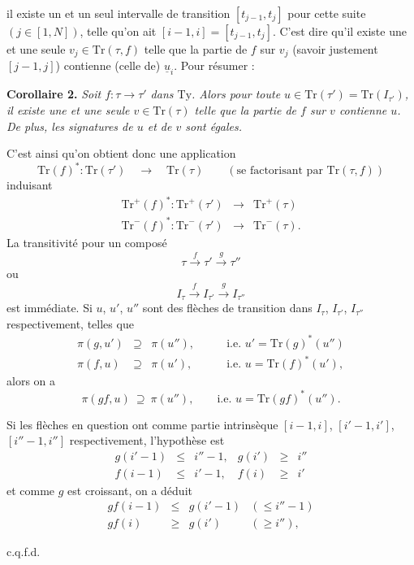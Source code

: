\documentclass[11pt]{article}
\newcommand{\printedpage}[1]{\marginpar{\footnotesize p.~#1}}
\newcommand{\msp}[1]{\marginpar{\footnotesize [#1]}}
\newcommand{\Ty}{\mathrm{Ty}}
\newcommand{\Tr}{\mathrm{Tr}}
\begin{document}
\printedpage{27}
\msp{page 42}
il existe un et un seul intervalle de transition $[t_{j-1}, t_j]$ pour cette suite $(j \in [1, N])$, telle qu'on ait $[i-1, i] = [t_{j-1}, t_j]$. C'est dire qu'il existe une et une seule $v_j \in \Tr(\tau, f)$ telle que la partie de $f$ sur $v_j$ (savoir justement $[j-1, j]$) contienne (celle de) $\underline{u}_i$. Pour résumer :

\textbf{Corollaire 2.} \textit{Soit $f : \tau \longrightarrow \tau'$ dans $\Ty$. Alors pour toute $u \in \Tr(\tau') = \Tr(I_{\tau'})$, il existe une et une seule $v \in \Tr(\tau)$ telle que la partie de $f$ sur $v$ contienne $u$. De plus, les signatures de $u$ et de $v$ sont égales.}

C'est ainsi qu'on obtient donc une application
\[
\Tr(f)^* : \Tr(\tau') \quad \longrightarrow \quad \Tr(\tau) \qquad (\text{se factorisant par } \Tr(\tau, f))
\]
induisant
\[
\begin{array}{rcl}
\Tr^+(f)^* : \Tr^+(\tau') & \longrightarrow & \Tr^+(\tau) \\
\Tr^-(f)^* : \Tr^-(\tau') & \longrightarrow & \Tr^-(\tau).
\end{array}
\]
La transitivité pour un composé
\[
\tau \xrightarrow{f} \tau' \xrightarrow{g} \tau''
\]
ou
\[
I_\tau \xrightarrow{f} I_{\tau'} \xrightarrow{g} I_{\tau''}
\]
est immédiate. Si $u$, $u'$, $u''$ sont des flèches de transition dans $I_\tau$, $I_{\tau'}$, $I_{\tau''}$ respectivement, telles que
\[
\begin{array}{rcll}
\pi(g, u') & \supseteq & \pi(u''), & \qquad \text{i.e. } u' = \Tr(g)^*(u'') \\
\pi(f, u) & \supseteq & \pi(u'), & \qquad \text{i.e. } u = \Tr(f)^*(u'),
\end{array}
\]
alors on a
\[
\pi(gf, u) \ \supseteq\ \pi(u''), \qquad \text{i.e. } u = \Tr(gf)^*(u'').
\]

\msp{page 43}
Si les flèches en question ont comme partie intrinsèque $[i-1, i]$, $[i'-1, i']$, $[i''-1, i'']$ respectivement, l'hypothèse est
\[
\begin{array}{rclrcl}
g(i'-1) & \leq & i''-1, & g(i') & \geq & i'' \\
f(i-1) & \leq & i'-1, & f(i) & \geq & i'
\end{array}
\]
et comme $g$ est croissant, on a déduit
\[
\begin{array}{rcll}
gf(i-1) & \leq & g(i'-1) & (\leq i''-1) \\
gf(i) & \geq & g(i') & (\geq i''),
\end{array}
\]
\begin{flushright}
c.q.f.d.
\end{flushright}
\end{document}
